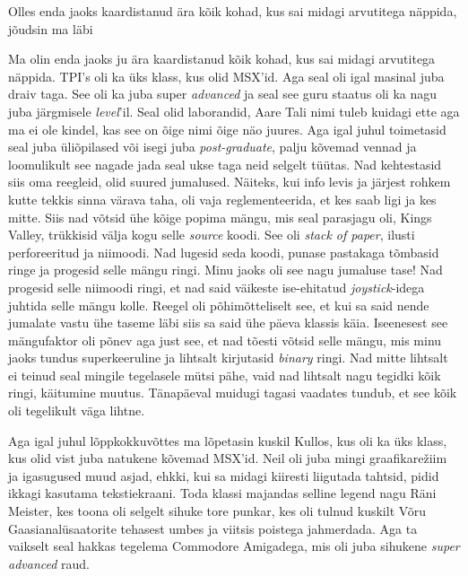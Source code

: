 Olles enda jaoks kaardistanud ära kõik kohad, kus sai midagi arvutitega 
näppida, jõudsin ma läbi

Ma olin enda jaoks ju ära kaardistanud kõik kohad, kus sai midagi arvutitega 
näppida. TPI's oli ka üks klass, kus olid 
MSX'id. Aga seal oli igal masinal juba draiv taga. 
See oli ka juba super \emph{advanced} ja seal see guru staatus oli ka nagu juba 
järgmisele \emph{level}'il. Seal olid  laborandid, Aare Tali nimi tuleb kuidagi ette aga ma ei ole kindel, kas see on õige nimi õige 
näo juures. Aga igal juhul toimetasid seal juba 
üliõpilased või isegi juba \emph{post-graduate},  palju kõvemad vennad ja 
loomulikult see nagade jada seal ukse taga neid selgelt tüütas. Nad kehtestasid 
siis oma  reegleid, olid suured jumalused. Näiteks, kui info levis ja järjest 
rohkem kutte tekkis sinna värava taha,  oli vaja reglementeerida, et kes saab 
ligi ja kes mitte. Siis nad võtsid ühe kõige popima mängu, mis seal parasjagu 
oli, Kings Valley, trükkisid välja kogu selle 
\emph{source} koodi. See oli \emph{stack of paper}, ilusti perforeeritud ja 
niimoodi. Nad lugesid seda koodi, punase pastakaga tõmbasid ringe ja progesid 
selle mängu ringi. Minu jaoks oli see nagu jumaluse tase! Nad progesid selle 
niimoodi ringi, et nad said väikeste ise-ehitatud \emph{joystick}-idega juhtida 
selle mängu kolle. Reegel oli põhimõtteliselt see, et kui sa said nende 
jumalate vastu ühe taseme läbi siis sa said ühe päeva klassis käia. Iseenesest 
see mängufaktor  oli põnev aga just see, et nad tõesti võtsid selle mängu, mis 
minu jaoks tundus superkeeruline ja lihtsalt kirjutasid \emph{binary} ringi. 
Nad mitte lihtsalt ei teinud seal mingile tegelasele mütsi pähe,  vaid nad 
lihtsalt nagu tegidki kõik ringi, käitumine muutus. Tänapäeval muidugi tagasi 
vaadates tundub, et see kõik oli tegelikult väga lihtne.


Aga igal juhul lõppkokkuvõttes ma lõpetasin kuskil Kullos, kus oli 
ka üks klass, kus olid vist juba natukene kõvemad MSX'id. Neil oli juba  mingi graafikarežiim ja igasugused muud asjad, ehkki, kui 
sa midagi kiiresti liigutada tahtsid, pidid ikkagi kasutama tekstiekraani. Toda 
klassi majandas selline legend nagu Räni Meister, kes 
toona oli selgelt sihuke tore punkar, kes oli tulnud kuskilt Võru 
Gaasianalüsaatorite tehasest umbes ja viitsis poistega jahmerdada. Aga ta 
vaikselt seal hakkas tegelema Commodore 
Amigadega, mis oli juba sihukene 
\emph{super advanced} raud. 

